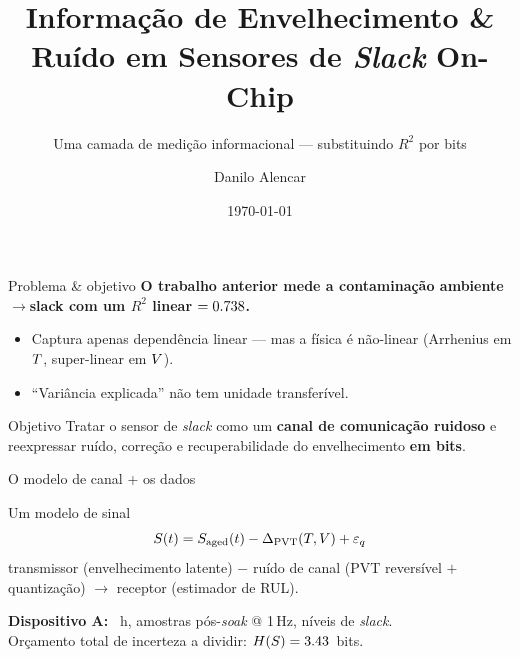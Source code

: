 \documentclass[aspectratio=169,11pt]{beamer}
\title{Informação de Envelhecimento \& Ruído em Sensores de \emph{Slack} On-Chip}
\subtitle{Uma camada de medição informacional --- substituindo $R^2$ por bits}
\author{Danilo Alencar}
\institute{PPGETI / UFC --- Teoria da Informa\c{c}\~ao (TIP7266), Trabalho Final 2026.1}
\date{\today}
\begin{document}
\maketitle

\begin{frame}{Problema \& objetivo}
  \textbf{O trabalho anterior mede a contaminação ambiente$\rightarrow$slack com um $R^2$ linear $= 0.738$.}
  \begin{itemize}
    \item Captura \alert{apenas} dependência linear --- mas a física é não-linear
          (Arrhenius em $T$, super-linear em $V$).
    \item ``Variância explicada'' \alert{não tem unidade transferível}.
  \end{itemize}
  \vfill
  \begin{block}{Objetivo}
    Tratar o sensor de \emph{slack} como um \textbf{canal de comunicação ruidoso}
    e reexpressar ruído, correção e recuperabilidade do envelhecimento \textbf{em bits}.
  \end{block}
\end{frame}

\begin{frame}{O modelo de canal + os dados}
  \begin{block}{Um modelo de sinal}
    \[ S(t) = S_{\mathrm{aged}}(t) - \Delta_{\mathrm{PVT}}(T,V) + \varepsilon_q \]
    transmissor (envelhecimento latente) $-$ ruído de canal (PVT reversível $+$ quantização)
    $\rightarrow$ receptor (estimador de RUL).
  \end{block}
  \textbf{Dispositivo A:} \valDurationHours~h, \valPostSoakSamples{} amostras pós-\emph{soak} @ 1\,Hz,
  \valSlackLevels{} níveis de \emph{slack}.\\
  Orçamento total de incerteza a dividir: $H\!\left(S\right) = 3.43$~bits.
\end{frame}
\end{document}
